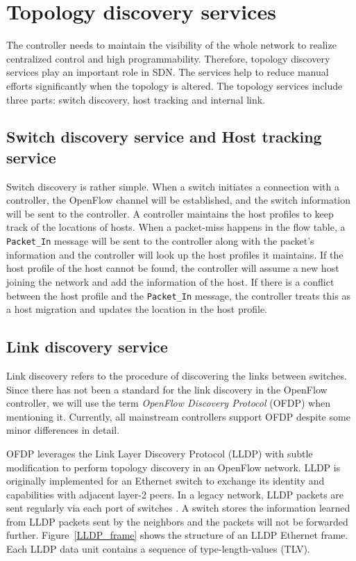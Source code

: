 \section{Topology discovery services}
\label{Topology discovery services}
The controller needs to maintain the visibility of the whole network to realize centralized control and high programmability. Therefore, topology discovery services play an important role in SDN. The services help to reduce manual efforts significantly when the topology is altered. The topology services include three parts: switch discovery, host tracking and internal link.

\subsection{Switch discovery service and Host tracking service}
Switch discovery is rather simple. When a switch initiates a connection with a controller, the OpenFlow channel will be established, and the switch information will be sent to the controller. A controller maintains the host profiles to keep track of the locations of hosts. When a packet-miss happens in the flow table, a \texttt{Packet\_In} message will be sent to the controller along with the packet's information and the controller will look up the host profiles it maintains. If the host profile of the host cannot be found, the controller will assume a new host joining the network and add the information of the host. If there is a conflict between the host profile and the \texttt{Packet\_In} message, the controller treats this as a host migration and updates the location in the host profile.

\subsection{Link discovery service}
\label{Link discovery service}
Link discovery refers to the procedure of discovering the links between switches. Since there has not been a standard for the link discovery in the OpenFlow controller, we will use the term \textit{OpenFlow Discovery Protocol} (OFDP) when mentioning it. Currently, all mainstream controllers support OFDP despite some minor differences in detail.

OFDP leverages the Link Layer Discovery Protocol (LLDP) with subtle modification to perform topology discovery in an OpenFlow network. LLDP is originally implemented for an Ethernet switch to exchange its identity and capabilities with adjacent layer-2 peers. In a legacy network, LLDP packets are sent regularly via each port of switches \cite{LLDP_WS}. A switch stores the information learned from LLDP packets sent by the neighbors and the packets will not be forwarded further. Figure~\ref{LLDP_frame} shows the structure of an LLDP Ethernet frame. Each LLDP data unit contains a sequence of type-length-values (TLV). 


